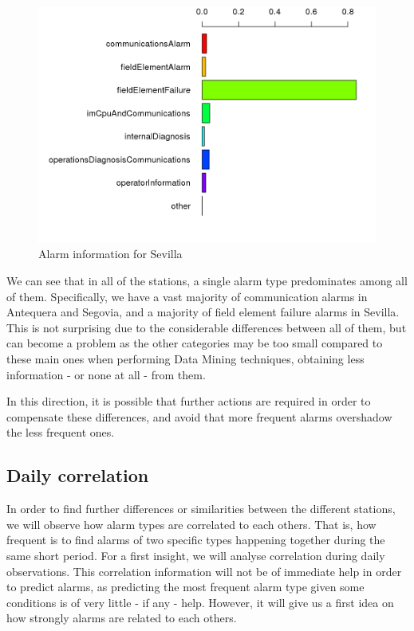 \begin{figure}[htb]
 \centering
 \includegraphics[width=\textwidth]{./img/sevilla_graph.png}
 \caption{Alarm information for Sevilla}
 \label{fig:sevilla_chart}
\end{figure}

\clearpage

We can see that in all of the stations, a single alarm type predominates among all of them. Specifically, we have a vast majority of communication alarms in Antequera and Segovia, and a majority of field element failure alarms in Sevilla. This is not surprising due to the considerable differences between all of them, but can become a problem as the other categories may be too small compared to these main ones when performing Data Mining techniques, obtaining less information - or none at all - from them.

In this direction, it is possible that further actions are required in order to compensate these differences, and avoid that more frequent alarms overshadow the less frequent ones.

\subsection{Daily correlation}
In order to find further differences or similarities between the different stations, we will observe how alarm types are correlated to each others\cite{edwards1976introduction}. That is, how frequent is to find alarms of two specific types happening together during the same short period. For a first insight, we will analyse correlation during daily observations. This correlation information will not be of immediate help in order to predict alarms, as predicting the most frequent alarm type given some conditions is of very little - if any - help. However, it will give us a first idea on how strongly alarms are related to each others.


